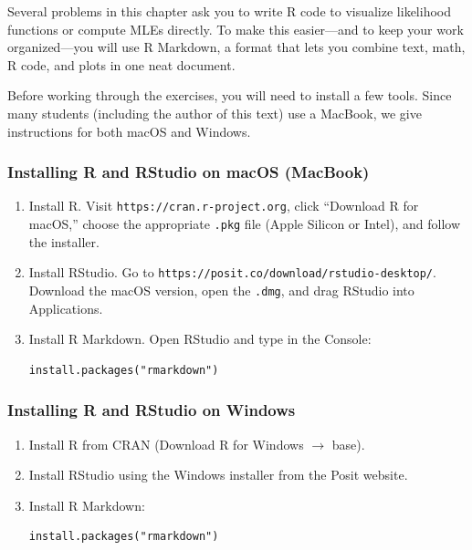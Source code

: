 \documentclass[11pt,letterpaper]{article}
\theoremstyle{remark}
\begin{document}
Several problems in this chapter ask you to write R code to visualize likelihood functions or compute MLEs directly. To make this easier---and to keep your work organized---you will use R Markdown, a format that lets you combine text, math, R code, and plots in one neat document.

Before working through the exercises, you will need to install a few tools. Since many students (including the author of this text) use a MacBook, we give instructions for both macOS and Windows.

\subsubsection*{Installing R and RStudio on macOS (MacBook)}

\begin{enumerate}
    \item Install R.
    Visit \texttt{https://cran.r-project.org}, click ``Download R for macOS,'' choose the appropriate \texttt{.pkg} file (Apple Silicon or Intel), and follow the installer.

    \item Install RStudio.
    Go to \texttt{https://posit.co/download/rstudio-desktop/}.
    Download the macOS version, open the \texttt{.dmg}, and drag RStudio into Applications.

    \item Install R Markdown.
    Open RStudio and type in the Console:
\begin{verbatim}
install.packages("rmarkdown")
\end{verbatim}
\end{enumerate}

\subsubsection*{Installing R and RStudio on Windows}

\begin{enumerate}
    \item Install R from CRAN (Download R for Windows $\rightarrow$ base).
    \item Install RStudio using the Windows installer from the Posit website.
    \item Install R Markdown:
\begin{verbatim}
install.packages("rmarkdown")
\end{verbatim}
\end{enumerate}
\end{document}
